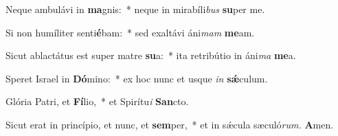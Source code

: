 \item Neque ambulávi in \textbf{ma}gnis:~* neque in mirabíli\textit{bus} \textbf{su}per me.
\item Si non humíliter senti\textbf{é}bam:~* sed exaltávi áni\textit{mam} \textbf{me}am.
\item Sicut ablactátus est super matre \textbf{su}a:~* ita retribútio in áni\textit{ma} \textbf{me}a.
\item Speret Israel in \textbf{Dó}mino:~* ex hoc nunc et usque \textit{in} \textbf{sǽ}culum.
\item Glória Patri, et \textbf{Fí}lio,~* et Spirítu\hspace{0.03em}\textit{i} \textbf{San}cto.
\item Sicut erat in princípio, et nunc, et \textbf{sem}per,~* et in sǽcula sæculó\textit{rum.} \textbf{A}men.